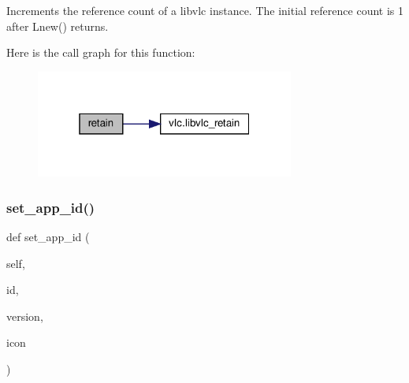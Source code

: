 \begin{DoxyVerb}Increments the reference count of a libvlc instance.
The initial reference count is 1 after L{new}() returns.
\end{DoxyVerb}
 Here is the call graph for this function\+:
\nopagebreak
\begin{figure}[H]
\begin{center}
\leavevmode
\includegraphics[width=241pt]{classvlc_1_1_instance_a6394d82a0b79f0f91bb059d20ab43490_cgraph}
\end{center}
\end{figure}
\mbox{\label{classvlc_1_1_instance_adfcc438909535cf3bc6e8c0de2009db3}} 
\subsubsection{\texorpdfstring{set\+\_\+app\+\_\+id()}{set\_app\_id()}}
{\footnotesize\ttfamily def set\+\_\+app\+\_\+id (\begin{DoxyParamCaption}\item[{}]{self,  }\item[{}]{id,  }\item[{}]{version,  }\item[{}]{icon }\end{DoxyParamCaption})}

